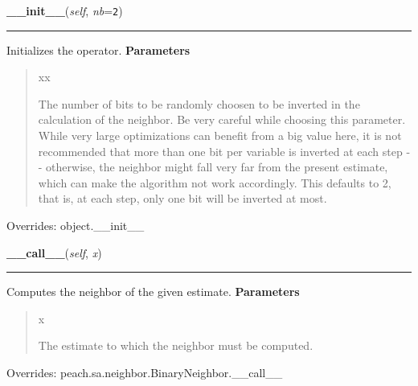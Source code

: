 \hspace{.8\funcindent}\begin{boxedminipage}{\funcwidth}

    \raggedright \textbf{\_\_init\_\_}(\textit{self}, \textit{nb}={\tt 2})

    \vspace{-1.5ex}

    \rule{\textwidth}{0.5\fboxrule}
\setlength{\parskip}{2ex}

Initializes the operator.
\setlength{\parskip}{1ex}
      \textbf{Parameters}
      \vspace{-1ex}

      \begin{quote}
        \begin{Ventry}{xx}

          \item[nb]


The number of bits to be randomly choosen to be inverted in the
calculation of the neighbor. Be very careful while choosing this
parameter. While very large optimizations can benefit from a big
value here, it is not recommended that more than one bit per
variable is inverted at each step -{}- otherwise, the neighbor might
fall very far from the present estimate, which can make the
algorithm not work accordingly. This defaults to 2, that is, at each
step, only one bit will be inverted at most.
        \end{Ventry}

      \end{quote}

      Overrides: object.\_\_init\_\_

    \end{boxedminipage}

    \vspace{0.5ex}

\hspace{.8\funcindent}\begin{boxedminipage}{\funcwidth}

    \raggedright \textbf{\_\_call\_\_}(\textit{self}, \textit{x})

    \vspace{-1.5ex}

    \rule{\textwidth}{0.5\fboxrule}
\setlength{\parskip}{2ex}

Computes the neighbor of the given estimate.
\setlength{\parskip}{1ex}
      \textbf{Parameters}
      \vspace{-1ex}

      \begin{quote}
        \begin{Ventry}{x}

          \item[x]


The estimate to which the neighbor must be computed.
        \end{Ventry}

      \end{quote}

      Overrides: peach.sa.neighbor.BinaryNeighbor.\_\_call\_\_

    \end{boxedminipage}



